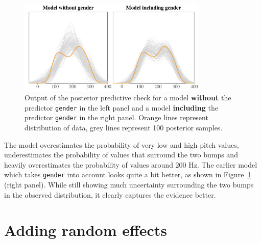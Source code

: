 \documentclass[nobib]{tufte-handout}
\begin{document}
\begin{figure}
  \centering
    \includegraphics[width = 0.8\textwidth]{pics/pp_checks_plot.pdf}
    \caption{Output of the posterior predictive check for a model \textbf{without} the predictor \texttt{gender} in the left panel and a model \textbf{including} the predictor \texttt{gender} in the right panel. Orange lines represent distribution of data, grey lines represent 100 posterior samples.}
    \label{fig:PPC}
\end{figure}


The model overestimates the probability of very low and high pitch values, underestimates the probability of values that surround the two bumps and heavily overestimates the probability of values around 200 Hz.
The earlier model which takes \texttt{gender} into account looks quite a bit better, as shown
in Figure~\ref{fig:PPC} (right panel). While still showing much uncertainty surrounding the two bumps in the observed distribution, it clearly captures the evidence better. 



\section{Adding random effects}
\end{document}
